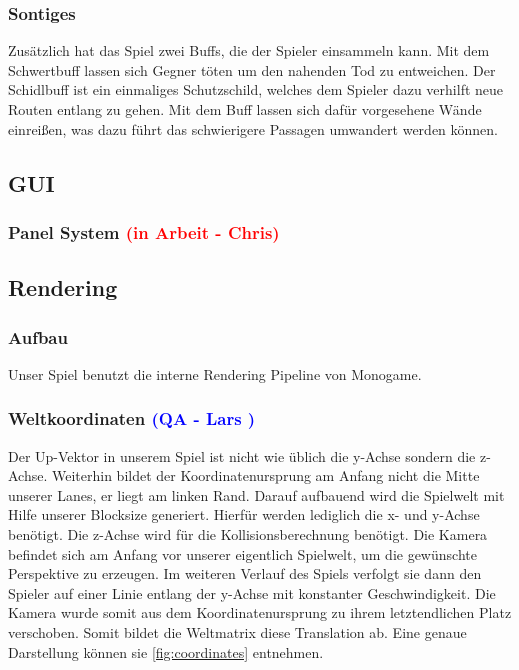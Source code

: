 \documentclass[12pt]{article}
\begin{document}
\vspace{1cm}
\subsubsection{Sontiges}

Zusätzlich hat das Spiel zwei Buffs, die der Spieler einsammeln kann. Mit dem Schwertbuff lassen sich Gegner töten um den nahenden Tod zu entweichen.
Der Schidlbuff ist ein einmaliges Schutzschild, welches dem Spieler dazu verhilft neue Routen entlang zu gehen. Mit dem Buff lassen sich dafür vorgesehene
Wände einreißen, was dazu führt das schwierigere Passagen umwandert werden können.

\vspace{2cm}
\subsection{GUI}

\vspace{1cm}
\subsubsection{Panel System \textcolor{red}{(in Arbeit - Chris)}}

\vspace{2cm}
\subsection{Rendering}

\vspace{1cm}
\subsubsection{Aufbau}

Unser Spiel benutzt die interne Rendering Pipeline von Monogame.

\vspace{1cm}
\subsubsection{Weltkoordinaten \textcolor{blue}{(QA - Lars )}}

Der Up-Vektor in unserem Spiel ist nicht wie üblich die y-Achse sondern die z-Achse. Weiterhin bildet der Koordinatenursprung am 
Anfang nicht die Mitte unserer Lanes, er liegt am linken Rand. Darauf aufbauend wird die Spielwelt mit Hilfe unserer Blocksize generiert. Hierfür 
werden lediglich die x- und y-Achse benötigt. Die z-Achse wird für die Kollisionsberechnung benötigt. Die Kamera befindet sich am Anfang 
vor unserer eigentlich Spielwelt, um die gewünschte Perspektive zu erzeugen. Im weiteren Verlauf des Spiels verfolgt sie dann den Spieler
auf einer Linie entlang der y-Achse mit konstanter Geschwindigkeit. Die Kamera wurde somit aus dem Koordinatenursprung zu ihrem letztendlichen
Platz verschoben. Somit bildet die Weltmatrix diese Translation ab. Eine genaue Darstellung können sie \ref{fig:coordinates} entnehmen.
\end{document}
